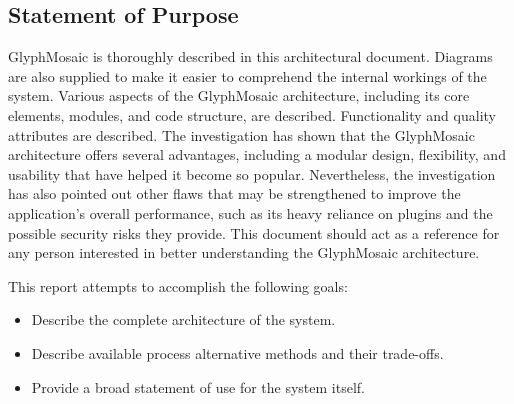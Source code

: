 \subsection{Statement of Purpose}
GlyphMosaic is thoroughly described in this architectural document.
Diagrams are also supplied to make it easier to comprehend the internal workings of the system.
Various aspects of the GlyphMosaic architecture,  including its core elements, modules, and code structure, are described.
Functionality and quality attributes are described.
The investigation has shown that the GlyphMosaic architecture offers several advantages, including a modular design, flexibility, and usability that have helped it become so popular.
Nevertheless, the investigation has also pointed out other flaws that may be strengthened to improve the application's overall performance, such as its heavy reliance on plugins and the possible security risks they provide.
This document should act as a reference for any person interested in better understanding the GlyphMosaic architecture.

This report attempts to accomplish the following goals:
\begin{itemize}
  \item Describe the complete architecture of the system.
  \item Describe available process alternative methods and their trade-offs.
  \item Provide a broad statement of use for the system itself.
\end{itemize}
